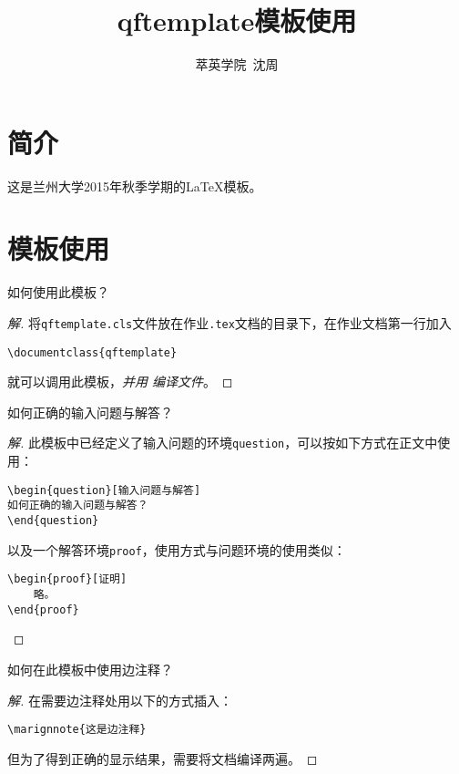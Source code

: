 \documentclass{qftemplate}
\author{萃英学院\ 沈周}
\title{qftemplate模板使用}
\begin{document}
\maketitle
\section{简介}
这是兰州大学2015年秋季学期的\LaTeX 模板。
\section{模板使用}
\begin{question}
如何使用此模板？
\end{question}
\begin{proof}[解]
    将{\tt qftemplate.cls}文件放在作业{\tt .tex}文档的目录下，在作业文档第一行加入
    \begin{verbatim}
\documentclass{qftemplate}
    \end{verbatim}
    就可以调用此模板，{\it 并用 \XeLaTeX 编译文件}。
\end{proof}

\begin{question}[输入问题与解答]
    如何正确的输入问题与解答？
\end{question}
\begin{proof}[解]
    此模板中已经定义了输入问题的环境{\tt question}，可以按如下方式在正文中使用：
\begin{verbatim}
\begin{question}[输入问题与解答]
如何正确的输入问题与解答？
\end{question}
\end{verbatim}
以及一个解答环境{\tt proof}，使用方式与问题环境的使用类似：
\begin{verbatim}
\begin{proof}[证明]
    略。
\end{proof}
\end{verbatim}
\end{proof}

\begin{question}[边注释]
    如何在此模板中使用边注释？
\end{question}
\begin{proof}[解]
    在需要边注释处用以下的方式插入：
\begin{verbatim}
\marignnote{这是边注释}
\end{verbatim}
但为了得到正确的显示结果，需要将文档编译两遍。
\end{proof}
\end{document}
